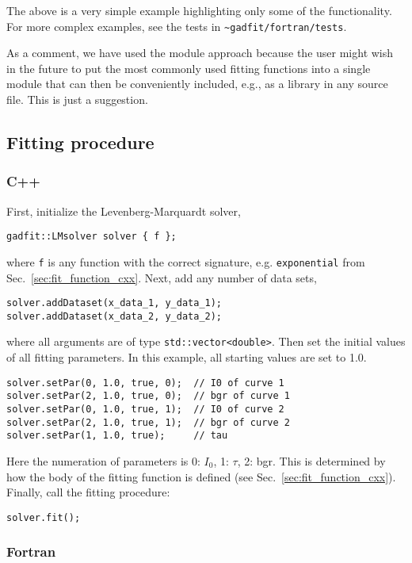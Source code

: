 \documentclass{article}
\begin{document}
The above is a very simple example highlighting only some of the functionality. For more complex examples, see the tests in \verb+~gadfit/fortran/tests+.

As a comment, we have used the module approach because the user might wish in the future to put the most commonly used fitting functions into a single module that can then be conveniently included, e.g., as a library in any source file. This is just a suggestion.

\subsection{Fitting procedure}

\subsubsection{C++}

First, initialize the Levenberg-Marquardt solver,
\begin{verbatim}
gadfit::LMsolver solver { f };
\end{verbatim}
where \texttt{f} is any function with the correct signature, e.g. \texttt{exponential} from Sec.~\ref{sec:fit_function_cxx}. Next, add any number of data sets,
\begin{verbatim}
solver.addDataset(x_data_1, y_data_1);
solver.addDataset(x_data_2, y_data_2);
\end{verbatim}
where all arguments are of type \texttt{std::vector<double>}. Then set the initial values of all fitting parameters. In this example, all starting values are set to 1.0.
\begin{verbatim}
solver.setPar(0, 1.0, true, 0);  // I0 of curve 1
solver.setPar(2, 1.0, true, 0);  // bgr of curve 1
solver.setPar(0, 1.0, true, 1);  // I0 of curve 2
solver.setPar(2, 1.0, true, 1);  // bgr of curve 2
solver.setPar(1, 1.0, true);     // tau
\end{verbatim}
Here the numeration of parameters is 0: $I_0$, 1: $\tau$, 2: bgr. This is determined by how the body of the fitting function is defined (see Sec.~\ref{sec:fit_function_cxx}). Finally, call the fitting procedure:
\begin{verbatim}
solver.fit();
\end{verbatim}

\subsubsection{Fortran}
\end{document}
